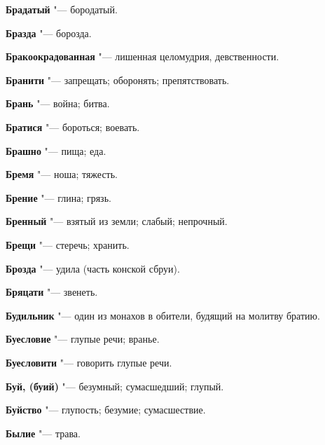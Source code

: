 \begin{mymulticols}{2}
\noindent\textbf{Брадатый} "--- бородатый. 




\noindent\textbf{Бразда} "--- борозда. 




\noindent\textbf{Бракоокрадованная} "--- лишенная целомудрия, девственности. 




\noindent\textbf{Бранити} "--- запрещать; оборонять; препятствовать. 




\noindent\textbf{Брань} "--- война; битва. 




\noindent\textbf{Братися} "--- бороться; воевать. 




\noindent\textbf{Брашно} "--- пища; еда. 




\noindent\textbf{Бремя} "--- ноша; тяжесть. 




\noindent\textbf{Брение} "--- глина; грязь. 




\noindent\textbf{Бренный} "--- взятый из земли; слабый; непрочный. 




\noindent\textbf{Брещи} "--- стеречь; хранить. 




\noindent\textbf{Брозда} "--- удила (часть конской сбруи). 




\noindent\textbf{Бряцати} "--- звенеть. 




\noindent\textbf{Будильник} "--- один из монахов в обители, будящий на молитву братию. 




\noindent\textbf{Буесловие} "--- глупые речи; вранье. 




\noindent\textbf{Буесловити} "--- говорить глупые речи. 




\noindent\textbf{Буй, (буий)} "--- безумный; сумасшедший; глупый. 




\noindent\textbf{Буйство} "--- глупость; безумие; сумасшествие. 




\noindent\textbf{Былие} "--- трава. 





\end{mymulticols}
